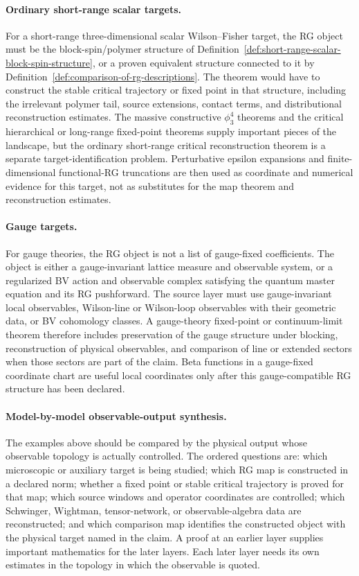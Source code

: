 \paragraph{Ordinary short-range scalar targets.}
For a short-range three-dimensional scalar Wilson--Fisher target, the RG
object must be the block-spin/polymer structure of
Definition~\ref{def:short-range-scalar-block-spin-structure}, or a proven
equivalent structure connected to it by
Definition~\ref{def:comparison-of-rg-descriptions}.  The theorem would have
to construct the stable critical trajectory or fixed point in that structure,
including the irrelevant polymer tail, source extensions, contact terms, and
distributional reconstruction estimates.  The massive constructive
\(\phi^4_3\) theorems and the critical hierarchical or long-range
fixed-point theorems supply important pieces of the landscape, but the
ordinary short-range critical reconstruction theorem is a separate
target-identification problem.  Perturbative epsilon expansions and
finite-dimensional functional-RG truncations are then used as coordinate and
numerical evidence for this target, not as substitutes for the map theorem
and reconstruction estimates.

\paragraph{Gauge targets.}
For gauge theories, the RG object is not a list of gauge-fixed coefficients.
The object is either a gauge-invariant lattice measure and observable system,
or a regularized BV action and observable complex satisfying the quantum
master equation and its RG pushforward.  The source layer must use
gauge-invariant local observables, Wilson-line or Wilson-loop observables
with their geometric data, or BV cohomology classes.  A gauge-theory
fixed-point or continuum-limit theorem therefore includes preservation of
the gauge structure under blocking, reconstruction of physical observables,
and comparison of line or extended sectors when those sectors are part of
the claim.  Beta functions in a gauge-fixed coordinate chart are useful
local coordinates only after this gauge-compatible RG structure has been
declared.

\paragraph{Model-by-model observable-output synthesis.}
The examples above should be compared by the physical output whose
observable topology is actually controlled.  The ordered questions are:
which microscopic or auxiliary target is being studied; which RG map is
constructed in a declared norm; whether a fixed point or stable critical
trajectory is proved for that map; which source windows and operator
coordinates are controlled; which Schwinger, Wightman, tensor-network, or
observable-algebra data are reconstructed; and which comparison map identifies
the constructed object with the physical target named in the claim.  A proof
at an earlier layer supplies important mathematics for the later layers.
Each later layer needs its own estimates in the topology in which the
observable is quoted.

